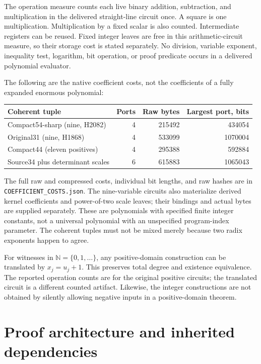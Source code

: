 \documentclass[11pt,a4paper]{article}
\newcommand{\N}{\mathbb N}
\newcommand{\file}[1]{\nolinkurl{#1}}
\theoremstyle{definition}
\theoremstyle{remark}
\numberwithin{equation}{section}
\begin{document}
The operation measure counts each live binary addition, subtraction, and
multiplication in the delivered straight-line circuit once. A square is
one multiplication. Multiplication by a fixed scalar is also counted.
Intermediate registers can be reused. Fixed integer leaves are free in
this arithmetic-circuit measure, so their storage cost is stated separately.
No division, variable exponent, inequality test, logarithm, bit operation,
or proof predicate occurs in a delivered polynomial evaluator.

The following are the native coefficient costs, not the coefficients of a
fully expanded enormous polynomial:
\begin{center}
\small
\begin{tabular}{lrrr}
\toprule
Coherent tuple & Ports & Raw bytes & Largest port, bits\\
\midrule
Compact54-sharp (nine, H2082) & 4 & 215492 & 434054\\
Original31 (nine, H1868) & 4 & 533099 & 1070004\\
Compact44 (eleven positives) & 4 & 295388 & 592884\\
Source34 plus determinant scales & 6 & 615883 & 1065043\\
\bottomrule
\end{tabular}
\end{center}
The full raw and compressed costs, individual bit lengths, and raw hashes
are in \file{COEFFICIENT_COSTS.json}. The nine-variable circuits also
materialize derived kernel coefficients and power-of-two scale leaves;
their bindings and actual bytes are supplied separately. These are
polynomials with specified finite integer constants, not a universal
polynomial with an unspecified program-index parameter. The coherent
tuples must not be mixed merely because two radix exponents happen to agree.

For witnesses in \(\N=\{0,1,\ldots\}\), any positive-domain construction
can be translated by \(x_j=u_j+1\). This preserves total degree and
existence equivalence. The reported operation counts are for the original
positive circuits; the translated circuit is a different counted artifact.
Likewise, the integer constructions are not obtained by silently allowing
negative inputs in a positive-domain theorem.

\section{Proof architecture and inherited dependencies}
\label{sec:status}
\end{document}

